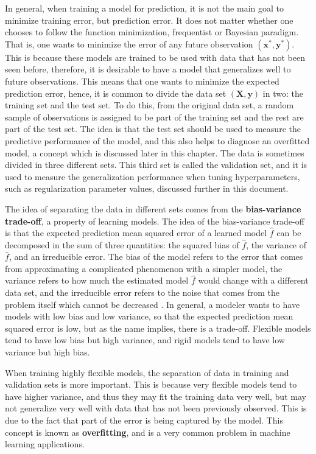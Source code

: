 In general, when training a model for prediction, it is not the main goal to minimize training error, but prediction error. It does not matter whether one chooses to follow the function minimization, frequentist or Bayesian paradigm. That is, one wants to minimize the error of any future observation $(\boldsymbol{x}^*, \boldsymbol{y}^*)$. This is because these models are trained to be used with data that has not been seen before, therefore, it is desirable to have a model that generalizes well to future observations. This means that one wants to minimize the expected prediction error, hence, it is common to divide the data set $(\boldsymbol{X}, \boldsymbol{y})$ in two: the training set and the test set. To do this, from the original data set, a random sample of observations is assigned to be part of the training set and the rest are part of the test set. The idea is that the test set should be used to measure the predictive performance of the model, and this also helps to diagnose an overfitted model, a concept which is discussed later in this chapter. The data is sometimes divided in three different sets. This third set is called the validation set, and it is used to measure the generalization performance when tuning hyperparameters, such as regularization parameter values, discussed further in this document.

The idea of separating the data in different sets comes from the \textbf{bias-variance trade-off}, a property of learning models. The idea of the bias-variance trade-off is that the expected prediction mean squared error of a learned model $\hat{f}$ can be decomposed in the sum of three quantities: the squared bias of $\hat{f}$, the variance of $\hat{f}$, and an irreducible error. The bias of the model refers to the error that comes from approximating a complicated phenomenon with a simpler model, the variance refers to how much the estimated model $\hat{f}$ would change with a different data set, and the irreducible error refers to the noise that comes from the problem itself which cannot be decreased \cite{friedman2001elements, james2013introduction}. In general, a modeler wants to have models with low bias and low variance, so that the expected prediction mean squared error is low, but as the name implies, there is a trade-off. Flexible models tend to have low bias but high variance, and rigid models tend to have low variance but high bias.

When training highly flexible models, the separation of data in training and validation sets is more important. This is because very flexible models tend to have higher variance, and thus they may fit the training data very well, but may not generalize very well with data that has not been previously observed. This is due to the fact that part of the error is being captured by the model. This concept is known as \textbf{overfitting}, and is a very common problem in machine learning applications.



